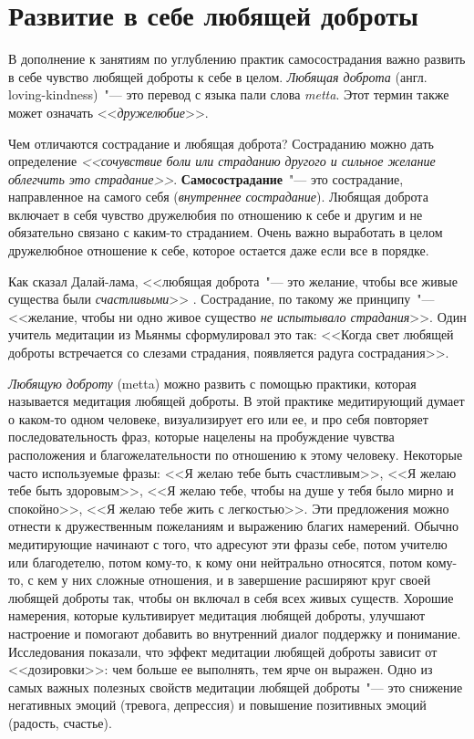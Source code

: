 
\chapter{Развитие в себе любящей доброты} \label{Developing_Loving-Kindness}

В дополнение к занятиям по углублению практик самосострадания важно развить в себе чувство любящей доброты к себе в целом. \emph{Любящая доброта} (англ. loving-kindness)~"--- это перевод с языка пали слова \emph{metta}\cite{65}. Этот термин также может означать <<\emph{дружелюбие}>>.

Чем отличаются сострадание и любящая доброта? Состраданию можно дать определение \emph{<<сочувствие боли или страданию другого и сильное желание облегчить это страдание>>}. \textbf{Самосострадание}~"--- это сострадание, направленное на самого себя (\emph{внутреннее сострадание})\cite{66}. Любящая доброта включает в себя чувство дружелюбия по отношению к себе и другим и не обязательно связано с каким-то страданием. Очень важно выработать в целом дружелюбное отношение к себе, которое остается даже если все в порядке.

Как сказал Далай-лама, <<любящая доброта~"--- это желание, чтобы все живые существа были \emph{счастливыми}>> \cite{67}. Сострадание, по такому же принципу~"--- <<желание, чтобы ни одно живое существо \emph{не испытывало страдания}>>. Один учитель медитации из Мьянмы сформулировал это так: <<Когда свет любящей доброты встречается со слезами страдания, появляется радуга сострадания>>.

\emph{Любящую доброту} (metta) можно развить с помощью практики, которая называется медитация любящей доброты. В этой практике медитирующий думает о каком-то одном человеке, визуализирует его или ее, и про себя повторяет последовательность фраз, которые нацелены на пробуждение чувства расположения и благожелательности по отношению к этому человеку. Некоторые часто используемые фразы: <<Я желаю тебе быть счастливым>>, <<Я желаю тебе быть здоровым>>, <<Я желаю тебе, чтобы на душе у тебя было мирно и спокойно>>, <<Я желаю тебе жить с легкостью>>. Эти предложения можно отнести к дружественным пожеланиям и выражению благих намерений. Обычно медитирующие начинают с того, что адресуют эти фразы себе, потом учителю или благодетелю, потом кому-то, к кому они нейтрально относятся, потом кому-то, с кем у них сложные отношения, и в завершение расширяют круг своей любящей доброты так, чтобы он включал в себя всех живых существ. Хорошие намерения, которые культивирует медитация любящей доброты, улучшают настроение и помогают добавить во внутренний диалог поддержку и понимание. Исследования показали, что эффект медитации любящей доброты зависит от <<дозировки>>: чем больше ее выполнять, тем ярче он выражен\cite{68}. Одно из самых важных полезных свойств медитации любящей доброты~"--- это снижение негативных эмоций (тревога, депрессия) и повышение позитивных эмоций (радость, счастье)\cite{69,70}.

